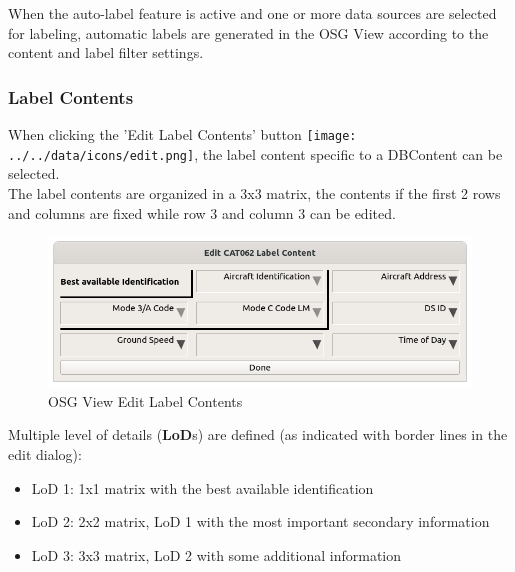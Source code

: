When the auto-label feature is active and one or more data sources are selected for labeling, automatic labels are generated in the OSG View according to the content and label filter settings. \\

\subsubsection{Label Contents}

When clicking the 'Edit Label Contents' button \texttt{[image: ../../data/icons/edit.png]}, the label content specific to a DBContent can be selected. \\

The label contents are organized in a 3x3 matrix, the contents if the first 2 rows and columns are fixed while row 3 and column 3 can be edited. 

\begin{figure}[H]
   \center
    \includegraphics[width=14cm]{figures/osgview_label_content_edit.png}
  \caption{OSG View Edit Label Contents}
\end{figure}

Multiple level of details (\textbf{LoD}s) are defined (as indicated with border lines in the edit dialog):
\begin{itemize}
 \item LoD 1: 1x1 matrix with the best available identification
 \item LoD 2: 2x2 matrix, LoD 1 with the most important secondary information
 \item LoD 3: 3x3 matrix, LoD 2 with some additional information
\end{itemize} 
\ \\

